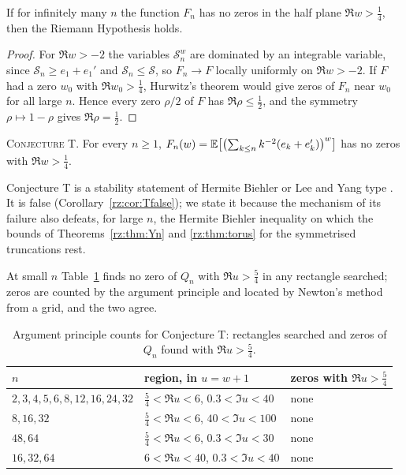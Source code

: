 \begin{theorem}\label{rz:thm:hurwitzrh}
If for infinitely many $n$ the function $F_n$ has no zeros in the half plane $\Re w>\frac14$, then the Riemann Hypothesis holds.
\end{theorem}

\begin{proof}
For $\Re w>-2$ the variables $\mathcal S_n^w$ are dominated by an integrable variable, since $\mathcal S_n\ge e_1+e_1'$ and $\mathcal S_n\le\mathcal S$, so $F_n\to F$ locally uniformly on $\Re w>-2$. If $F$ had a zero $w_0$ with $\Re w_0>\frac14$, Hurwitz's theorem would give zeros of $F_n$ near $w_0$ for all large $n$. Hence every zero $\rho/2$ of $F$ has $\Re\rho\le\frac12$, and the symmetry $\rho\mapsto1-\rho$ gives $\Re\rho=\frac12$.
\end{proof}

\medskip
\noindent\textsc{Conjecture T.} For every $n\ge1$, $F_n(w)=\mathbb{E}\bigl[\bigl(\sum_{k\le n}k^{-2}(e_k+e_k')\bigr)^w\bigr]$ has no zeros with $\Re w>\frac14$.
\medskip

Conjecture T is a stability statement of Hermite Biehler or Lee and Yang type \cite{LeeYang}. It is false (Corollary~\ref{rz:cor:Tfalse}); we state it because the mechanism of its failure also defeats, for large $n$, the Hermite Biehler inequality on which the bounds of Theorems~\ref{rz:thm:Yn} and \ref{rz:thm:torus} for the symmetrised truncations rest.

At small $n$ Table~\ref{rz:tab:Trect} finds no zero of $Q_n$ with $\Re u>\frac54$ in any rectangle searched; zeros are counted by the argument principle and located by Newton's method from a grid, and the two agree.

\begin{table}[htbp]
\centering
\small
\begin{tabular}{lll}
\toprule
$n$ & region, in $u=w+1$ & zeros with $\Re u>\frac54$\\
\midrule
$2,3,4,5,6,8,12,16,24,32$ & $\frac54<\Re u<6$, $0.3<\Im u<40$ & none\\
$8,16,32$ & $\frac54<\Re u<6$, $40<\Im u<100$ & none\\
$48,64$ & $\frac54<\Re u<6$, $0.3<\Im u<30$ & none\\
$16,32,64$ & $6<\Re u<40$, $0.3<\Im u<40$ & none\\
\bottomrule
\end{tabular}
\caption{Argument principle counts for Conjecture T: rectangles searched and zeros of $Q_n$ found with $\Re u>\frac54$.}
\label{rz:tab:Trect}
\end{table}


